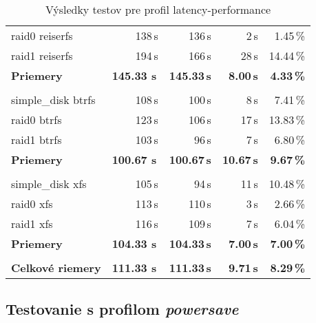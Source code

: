 {{\begin{table}[H]
\begin{center}
\begin{tabular}{|l|r r r r|}
    raid0 reiserfs & 138\,s & 136\,s & 2\,s & 1.45\,\% \\
    raid1 reiserfs & 194\,s & 166\,s & 28\,s & 14.44\,\% \\
    \hline
    \textbf{Priemery} & \textbf{145.33 s}\,& \textbf{145.33\,s} & \textbf{8.00\,s} & \textbf{4.33\,\%} \\
    \hline & \\[-1em]\hline
    simple\_disk btrfs & 108\,s & 100\,s & 8\,s & 7.41\,\% \\
    raid0 btrfs & 123\,s & 106\,s & 17\,s & 13.83\,\% \\
    raid1 btrfs & 103\,s & 96\,s & 7\,s & 6.80\,\% \\
    \hline
    \textbf{Priemery} & \textbf{100.67 s}\,& \textbf{100.67\,s} & \textbf{10.67\,s} & \textbf{9.67\,\%} \\
    \hline & \\[-1em]\hline
    simple\_disk xfs & 105\,s & 94\,s & 11\,s & 10.48\,\% \\
    raid0 xfs & 113\,s & 110\,s & 3\,s & 2.66\,\% \\
    raid1 xfs & 116\,s & 109\,s & 7\,s & 6.04\,\% \\
    \hline
    \textbf{Priemery} & \textbf{104.33 s}\,& \textbf{104.33\,s} & \textbf{7.00\,s} & \textbf{7.00\,\%} \\
    \hline & \\[-1em]\hline
    \textbf{Celkové riemery} & \textbf{111.33 s}\,& \textbf{111.33\,s} & \textbf{9.71\,s} & \textbf{8.29\,\%} \\
    \hline
\end{tabular}
\caption{Výsledky testov pre profil latency-performance}
\label{tab:results-xfs}
\end{center}
\end{table}

\subsection{Testovanie s profilom \emph{powersave}}

}}
